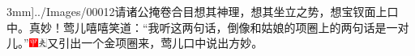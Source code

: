 {3mm]{../Images/00012}\footnotesize \kaishu 请诸公掩卷合目想其神理，想其坐立之势，想宝钗面上口中。真妙！}莺儿嘻嘻笑道：``我听这两句话，倒像和姑娘的项圈上的两句话是一对儿。''{\includegraphics[width=3mm]{../Images/00002}\includegraphics[width=3mm]{../Images/00012}\footnotesize \kaishu 又引出一个金项圈来，莺儿口中说出方妙。　}
